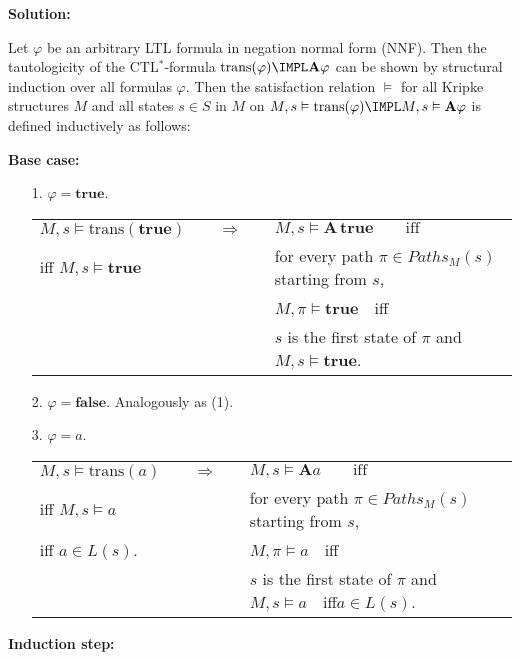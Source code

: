 \textbf{Solution:}

\bigskip

Let $\varphi $ be an arbitrary LTL formula in negation normal form (NNF).
Then the tautologicity of the CTL$^{\ast }$-formula $\mathrm{trans}(\varphi )%
\IMPL\mathbf{A}\varphi $ can be shown by structural induction over all
formulas $\varphi $. Then the satisfaction relation $\models $ for all
Kripke structures $M$ and all states $s\in S$ in $M$ on $M,s\vDash \mathrm{%
trans}(\varphi )\IMPL M,s\vDash \mathbf{A}\varphi $ is defined inductively
as follows:

\newpage

{\small
\textbf{Base case:}

\bigskip

\begin{enumerate}
\item[1.] $\varphi =\mathbf{true}.$

\begin{tabular}{lcl}
$M,s\vDash \mathrm{trans}(\mathbf{true})$ & $\quad \Rightarrow \quad $ & $%
M,s\vDash \mathbf{A\,true}\qquad \text{iff}$ \\ 
iff $M,s\vDash \mathbf{true}$ &  & for every path $\pi \in Paths_{M}(s)$
starting from $s$, \\ 
&  &  $M,\pi \vDash \mathbf{true}\quad $iff \\ 
&  & $s$ is the first state of $\pi $ and $M,s\vDash \mathbf{true}$.%
\end{tabular}

\item[2.] $\varphi =\mathbf{false}.$ Analogously as (1).

\item[3.] $\varphi =a.$

\begin{tabular}{lcl}
$M,s\vDash \mathrm{trans}(a)$ & $\quad \Rightarrow \quad $ & $M,s\vDash 
\mathbf{A}a\qquad \text{iff}$ \\ 
iff $M,s\vDash a$ &  & for every path $\pi \in Paths_{M}(s)$ starting from $s
$,  \\ 
iff $a\in L(s)$. &  & $M,\pi \vDash a\quad $iff \\ 
&  & $s$ is the first state of $\pi $ and $M,s\vDash a\quad $iff\quad $a\in
L(s)$.%
\end{tabular}
\end{enumerate}

\bigskip

\textbf{Induction step:}

\bigskip

}
